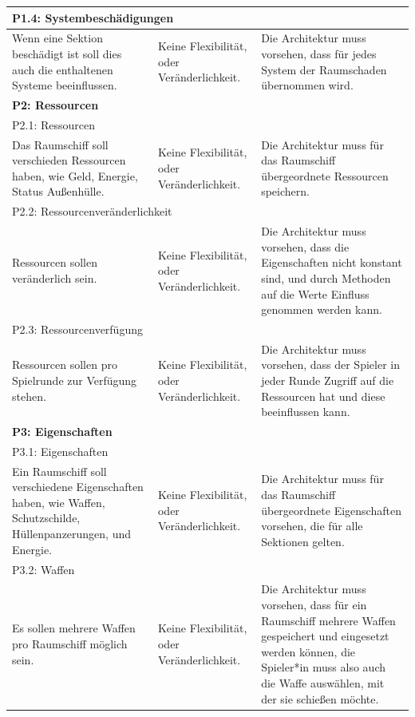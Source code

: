 \documentclass[fontsize=12pt,paper=a4,twoside]{scrartcl}
\begin{document}
\begin{longtable}[c]{|p{5cm}|p{5cm}|p{5cm}|}
\\ \hline
\multicolumn{3}{|l|}{{P1.4: Systembeschädigungen}} 
\\ \hline
Wenn eine Sektion beschädigt ist soll dies auch die enthaltenen Systeme beeinflussen. & Keine Flexibilität, oder Veränderlichkeit.    & Die Architektur muss vorsehen, dass für jedes System der Raumschaden übernommen wird. 
\\ \hline
%
\multicolumn{3}{|l|}{{\textbf{P2: Ressourcen}}} 
\\ \hline
\multicolumn{3}{|l|}{{P2.1: Ressourcen}} 
\\ \hline
Das Raumschiff soll verschieden Ressourcen haben, wie Geld, Energie, Status Außenhülle.  & Keine Flexibilität, oder Veränderlichkeit.    & Die Architektur muss für das Raumschiff übergeordnete Ressourcen speichern. 
\\ \hline                                                      
\multicolumn{3}{|l|}{{P2.2: Ressourcenveränderlichkeit}} 
\\ \hline
Ressourcen sollen veränderlich sein. & Keine Flexibilität, oder Veränderlichkeit.    & Die Architektur muss vorsehen, dass die Eigenschaften nicht konstant sind, und durch Methoden auf die Werte Einfluss genommen werden kann. 
\\ \hline
\multicolumn{3}{|l|}{{P2.3: Ressourcenverfügung}} 
\\ \hline
Ressourcen sollen pro Spielrunde zur Verfügung stehen. & Keine Flexibilität, oder Veränderlichkeit.    & Die Architektur muss vorsehen, dass der Spieler in jeder Runde Zugriff auf die Ressourcen hat und diese beeinflussen kann. 
\\ \hline
%
\multicolumn{3}{|l|}{{\textbf{P3: Eigenschaften}}} 
\\ \hline
\multicolumn{3}{|l|}{{P3.1: Eigenschaften}} 
\\ \hline
Ein Raumschiff soll verschiedene Eigenschaften haben, wie Waffen, Schutzschilde, Hüllenpanzerungen, und Energie. & Keine Flexibilität, oder Veränderlichkeit.    &  Die Architektur muss für das Raumschiff übergeordnete Eigenschaften vorsehen, die für alle Sektionen gelten. 
\\ \hline
\multicolumn{3}{|l|}{{P3.2: Waffen}} 
\\ \hline
Es sollen mehrere Waffen pro Raumschiff möglich sein. & Keine Flexibilität, oder Veränderlichkeit.    & Die Architektur muss vorsehen, dass für ein Raumschiff mehrere Waffen gespeichert und eingesetzt werden können, die Spieler*in muss also auch die Waffe auswählen, mit der sie schießen möchte. 

\end{longtable}
\end{document}
